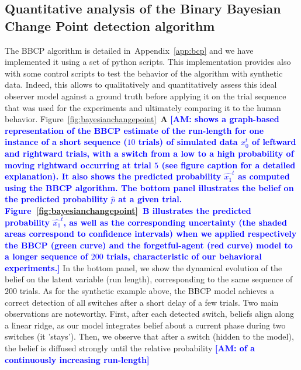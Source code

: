 \documentclass[12pt,english]{article}%
\newcommand{\seeFig}[1]{Figure~\ref{fig:#1}}
\newcommand{\seeApp}[1]{Appendix~\ref{app:#1}}
\newcommand{\AM}[1]{\textbf{\textcolor{blue}{[AM: #1]}}}
\begin{document}
\subsection{Quantitative analysis of the Binary Bayesian Change Point detection algorithm}
The BBCP algorithm is detailed in~\seeApp{bcp} and 
we have implemented it using a set of python scripts.
This implementation provides also with some control scripts
to test the behavior of the algorithm with synthetic data.
Indeed, this allows to qualitatively and quantitatively assess 
this ideal observer model against a ground truth before applying it
on the trial sequence that was used for the experiments and 
ultimately comparing it to the human behavior. %
\seeFig{bayesianchangepoint}~\textbf{A} \AM{shows a graph-based representation of the BBCP estimate of the run-length for one instance of a short sequence ($10$ trials) of simulated data $x_0^t$
of leftward and rightward trials, with a switch from a low to a high probability 
of moving rightward occurring at trial $5$ (see figure caption for a detailed explanation).
It also shows the predicted probability $\hat{x_1}^t$
as computed using the BBCP algorithm.
The bottom panel illustrates
the belief on the predicted probability $\hat{p}$ at a given trial.
\seeFig{bayesianchangepoint}~\textbf{B} illustrates the predicted probability $\hat{x_1}^t$, as well as the corresponding uncertainty (the shaded areas correspond to confidence intervals) when
we applied respectively the BBCP (green curve) and the forgetful-agent (red curve) model to 
a longer sequence of $200$ trials,
characteristic of our behavioral experiments.}
In the bottom panel, 
we show the dynamical evolution of the belief on the latent variable (run length),
corresponding to the same sequence of $200$ trials.
As for the synthetic example above,
the BBCP model achieves a correct detection of all switches after a short delay of a few trials.
Two main observations are noteworthy. First, after each detected switch, beliefs align along a linear ridge,
as our model integrates belief about a current phase during two switches (it 'stays').
Then, we observe that after a switch (hidden to the model),
the belief is diffused strongly until the relative probability \AM{of a continuously increasing run-length}
\end{document}
